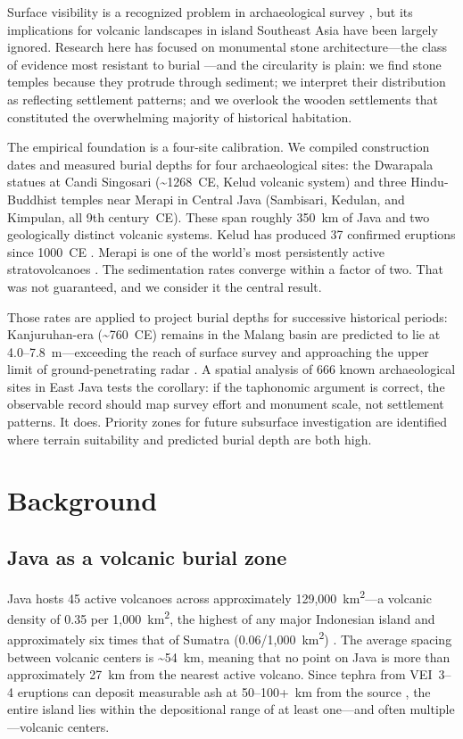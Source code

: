 \documentclass[egqsj, manuscript]{copernicus}
\begin{document}
Surface visibility is a recognized problem in archaeological survey \citep{wandsnider1992,french2003}, but its implications for volcanic landscapes in island Southeast Asia have been largely ignored. Research here has focused on monumental stone architecture---the class of evidence most resistant to burial \citep{degroot2009}---and the circularity is plain: we find stone temples because they protrude through sediment; we interpret their distribution as reflecting settlement patterns; and we overlook the wooden settlements that constituted the overwhelming majority of historical habitation.

The empirical foundation is a four-site calibration. We compiled construction dates and measured burial depths for four archaeological sites: the Dwarapala statues at Candi Singosari (\textasciitilde1268~CE, Kelud volcanic system) and three Hindu-Buddhist temples near Merapi in Central Java (Sambisari, Kedulan, and Kimpulan, all 9th century~CE). These span roughly 350~km of Java and two geologically distinct volcanic systems. Kelud has produced 37 confirmed eruptions since 1000~CE \citep{gvp2024}. Merapi is one of the world's most persistently active stratovolcanoes \citep{gertisser2012}. The sedimentation rates converge within a factor of two. That was not guaranteed, and we consider it the central result.

Those rates are applied to project burial depths for successive historical periods: Kanjuruhan-era (\textasciitilde760~CE) remains in the Malang basin are predicted to lie at 4.0--7.8~m---exceeding the reach of surface survey and approaching the upper limit of ground-penetrating radar \citep{putra2019}. A spatial analysis of 666 known archaeological sites in East Java tests the corollary: if the taphonomic argument is correct, the observable record should map survey effort and monument scale, not settlement patterns. It does. Priority zones for future subsurface investigation are identified where terrain suitability and predicted burial depth are both high.


\section{Background}

\subsection{Java as a volcanic burial zone}

Java hosts 45 active volcanoes across approximately 129,000~km\textsuperscript{2}---a volcanic density of 0.35 per 1,000~km\textsuperscript{2}, the highest of any major Indonesian island and approximately six times that of Sumatra (0.06/1,000~km\textsuperscript{2}) \citep{vanbemmelen1949}. The average spacing between volcanic centers is \textasciitilde54~km, meaning that no point on Java is more than approximately 27~km from the nearest active volcano. Since tephra from VEI~3--4 eruptions can deposit measurable ash at 50--100+~km from the source \citep{newhall1982}, the entire island lies within the depositional range of at least one---and often multiple---volcanic centers.
\end{document}
